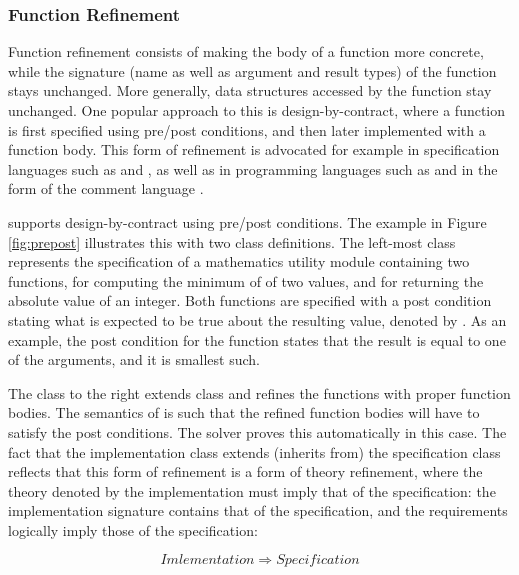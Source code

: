 \subsubsection{Function Refinement}

Function refinement consists of making the body of a function more concrete,
while the signature (name as well as  argument and result types) of the 
function stays unchanged. More generally, data 
structures accessed by the function stay unchanged. One popular approach to this
is design-by-contract, where a function is first specified using pre/post 
conditions, and then later implemented with a function body. This form of 
refinement is advocated for example in specification languages such as 
\vdm{} \cite{vdm78,bjoerner-jones-82,jones90} and \raiselang{} \cite{raise92,george-raise-2008}, as well as in programming languages such as \eiffel{} \cite{eiffel} and \java{} in the form of the \jml{} comment language \cite{jml}. 

\Klang{} supports design-by-contract using pre/post conditions. The example in
Figure \ref{fig:prepost} illustrates this with two class definitions. The left-most
class  represents the specification of a mathematics utility 
module containing two functions,  for computing the minimum of of
two values, and  for returning the absolute value of an integer. Both 
functions are specified with a post condition stating what is expected to be true
about the resulting value, denoted by . As an example, the post
condition for the  function states that the result is equal to one of
the arguments, and it is smallest such.

The class 
to the right extends class  and refines the functions with
proper function bodies. The semantics of \Klang{} is such that the refined function 
bodies will have to satisfy the post conditions. The \Klang{} solver proves this
automatically in this case. The fact that the implementation class extends 
(inherits from) the specification class reflects that this form of refinement is a 
form of theory refinement, where the theory denoted by the implementation must imply 
that of the specification: the implementation signature contains that of the 
specification, and the requirements logically imply those of the specification:

\[
Imlementation \Rightarrow Specification
\]

